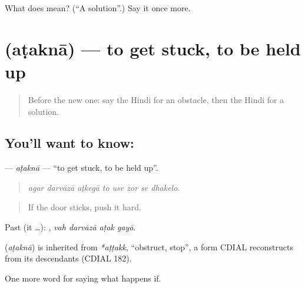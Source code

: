 \begin{tcolorbox}[breakable,colback=teal!4,colframe=teal!35!black,title={Before you move on}]
What does  mean? (\textquotedblleft{}A solution\textquotedblright{}.) Say it once more.
\end{tcolorbox}
\section[\texorpdfstring{\hi{अटकना} (aṭaknā)}{अटकना (aṭaknā)}]{ (aṭaknā) — to get stuck, to be held up}

\label{lesson:HI-C380-atakna}



\begin{quote}
Before the new one: say the Hindi for an obstacle, then the Hindi for a solution.
\end{quote}

\subsection*{You'll want to know: }
\textbf{} — \emph{aṭaknā} — \textquotedblleft{}to get stuck, to be held up\textquotedblright{}.

\begin{quote}
       
\end{quote}

\begin{quote}
\emph{agar darvāzā aṭkegā to use zor se dhakelo.}
\end{quote}

\begin{quote}
If the door sticks, push it hard.
\end{quote}

Past (it …):    , \emph{vah darvāzā aṭak gayā}.

\begin{cousinweb}
\textbf{} (\emph{aṭaknā}) is inherited from \emph{*aṭṭakk}, \textquotedblleft{}obstruct, stop\textquotedblright{}, a form CDIAL reconstructs from its descendants (CDIAL 182).
\end{cousinweb}

\begin{grammarlens}[title={What you've built}]
One more word for saying what happens if.
\end{grammarlens}

